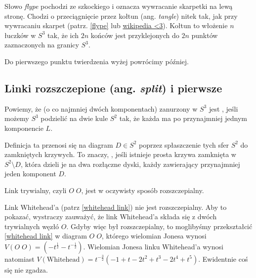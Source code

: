 \documentclass{article}
\begin{document}
Słowo \emph{flype} pochodzi ze szkockiego i oznacza wywracanie skarpetki na lewą stronę. Chodzi o przeciągnięcie przez kołtun (ang. \emph{tangle}) nitek tak, jak przy wywracaniu skarpet (patrz. \cref{flype} lub \href{https://en.wikipedia.org/wiki/Flype}{wikipedia <3}). Kołtun to włożenie $n$ łuczków w $S^3$ tak, że ich $2n$ końców jest przyklejonych do $2n$ punktów zaznaczonych na granicy $S^3$.

Do pierwszego punktu twierdzenia wyżej powrócimy później. %

\subsection{Linki rozszczepione (ang. \emph{split}) i pierwsze}

\begin{deff}
  Powiemy, że  (o co najmniej dwóch komponentach) zanurzony w $S^3$ jest , jeśli możemy $S^3$ podzielić na dwie kule $S^2$ tak, że każda ma po przynajmniej jednym komponencie $L$. 

  Definicja ta przenosi się na diagram $D\in S^2$ poprzez spłaszczenie tych sfer $S^2$ do zamkniętych krzywych. To znaczy, , jeśli istnieje prosta krzywa zamknięta w $S^2\setminus D$, która dzieli je na dwa rozłączne dyski, każdy zawierający przynajmniej jeden komponent $D$.
\end{deff}

Link trywialny, czyli $O\;O$, jest w oczywisty sposób rozszczepialny. 

Link Whitehead'a (patrz \cref{whitehead link}) nie jest rozszczepialny. Aby to pokazać, wystraczy zauważyć, że link Whitehead'a składa się z dwóch trywialnych węzłó $O$. Gdyby więc był rozszczepialny, to moglibyśmy przekształcić \cref{whitehead link} w diagram $O\;O$, którego wielomian Jonesa wynosi $V(O\;O)=(-t^{\frac{1}{2}}-t^{-\frac{1}{2}})$. Wielomian Jonesa linku Whitehead'a wynosi natomiast $V(\text{Whitehead})=t^{-\frac{3}{2}}(-1+t-2t^2+t^3-2t^4+t^5)$. Ewidentnie coś się nie zgadza.
\end{document}
